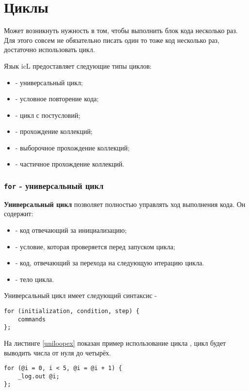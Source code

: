 \documentclass[a4paper, 14pt]{extarticle}
\newenvironment{icItems}
	{ \begin{itemize} [noitemsep,nolistsep] }
	{ \end{itemize} }
\begin{document}
\section{Циклы}

Может возникнуть нужность в том, чтобы выполнить блок кода несколько раз. Для этого совсем не обязательно писать один то тоже код несколько раз, достаточно использовать цикл.

Язык icL предоставляет следующие типы циклов:

\begin{icItems}
\item
	 - универсальный цикл;
\item
	 - условное повторение кода;
\item
	 - цикл с постусловий;
\item
	 - прохождение коллекций;
\item
	 - выборочное прохождение коллекций;
\item
	 - частичное прохождение коллекций.
\end{icItems}


\subsubsection{\lstinline`for` - универсальный цикл}

{\bf Универсальный цикл} позволяет полностью управлять ход выполнения кода. Он содержит:

\begin{icItems}
\item
	 - код отвечающий за инициализацию;
\item
	 - условие, которая проверяется перед запуском цикла;
\item
	 - код, отвечающий за перехода на следующую итерацию цикла.
\item
	 - тело цикла.
\end{icItems}

Универсальный цикл имеет следующий синтаксис -
\begin{lstlisting}[numbers=none]
for (initialization, condition, step) {
	commands
};
\end{lstlisting}

На листинге \ref{uniloopex} показан пример использование цикла , цикл будет выводить числа от нуля до четырёх.

\begin{lstlisting}[caption=Универсальный цикл, label=uniloopex]
for (@i = 0, i < 5, @i = @i + 1) {
	_log.out @i;
};
\end{lstlisting}
\end{document}

